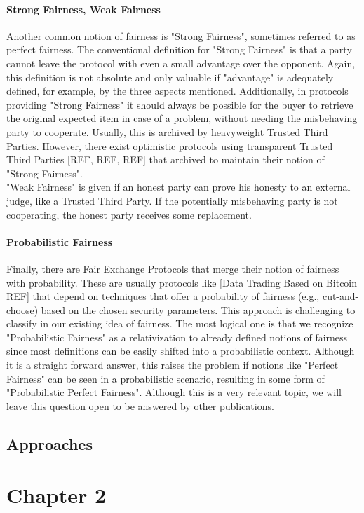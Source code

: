 \documentclass{cacthesis}
\begin{document}
        \subsubsection{Strong Fairness, Weak Fairness}
        Another common notion of fairness is "Strong Fairness", sometimes referred to as perfect fairness. The conventional definition for "Strong Fairness" is that a party cannot leave the protocol with even a small advantage over the opponent. Again, this definition is not absolute and only valuable if "advantage" is adequately defined, for example, by the three aspects mentioned. Additionally, in protocols providing "Strong Fairness" it should always be possible for the buyer to retrieve the original expected item in case of a problem, without needing the misbehaving party to cooperate. Usually, this is archived by heavyweight Trusted Third Parties. However, there exist optimistic protocols using transparent Trusted Third Parties [REF, REF, REF] that archived to maintain their notion of "Strong Fairness". \\
        "Weak Fairness" is given if an honest party can prove his honesty to an external judge, like a Trusted Third Party. If the potentially misbehaving party is not cooperating, the honest party receives some replacement. \\
        \subsubsection{Probabilistic Fairness}
        Finally, there are Fair Exchange Protocols that merge their notion of fairness with probability. These are usually protocols like [Data Trading Based on Bitcoin REF] that depend on techniques that offer a probability of fairness (e.g., cut-and-choose) based on the chosen security parameters. This approach is challenging to classify in our existing idea of fairness. The most logical one is that we recognize "Probabilistic Fairness" as a relativization to already defined notions of fairness since most definitions can be easily shifted into a probabilistic context. Although it is a straight forward answer, this raises the problem if notions like "Perfect Fairness" can be seen in a probabilistic scenario, resulting in some form of "Probabilistic Perfect Fairness". Although this is a very relevant topic, we will leave this question open to be answered by other publications.
        
        \section{Approaches}

		
	\chapter{Chapter 2}
	
	
	\appendix
\end{document}
